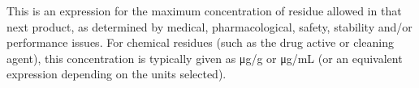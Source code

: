 This is an expression for the maximum concentration of residue allowed in that next product, as determined by medical, pharmacological, safety, stability and/or performance issues. For chemical residues (such as the drug active or cleaning agent), this concentration is typically given as μg/g or μg/mL (or an equivalent expression depending on the units selected).\relax